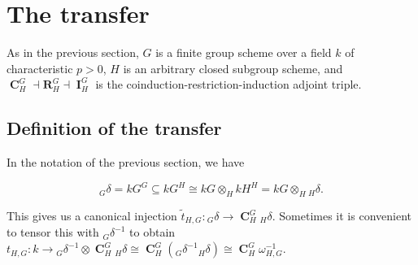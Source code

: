 \documentclass[12pt]{amsart}
\theoremstyle{definition}
\DeclareMathOperator{\ind}{\mathbf{I}}
\DeclareMathOperator{\coind}{\mathbf{C}}
\begin{document}
\section{The transfer}\label{sec:transfer}



As in the previous section, $G$ is a finite group scheme over a field $k$ of characteristic $p>0$, $H$ is an arbitrary closed subgroup scheme, and $\coind_H^G \dashv \mathbf{R}_H^G\dashv \ind_H^G$ is the coinduction-restriction-induction adjoint triple.

\subsection{Definition of the transfer}\label{sec:deftransfer}
In the notation of the previous section, we have 

\[ {}_G \delta = kG^G \subseteq kG^H \cong kG \otimes_H kH^H = kG \otimes_H {}_H \delta . \]

This gives us a canonical injection $\tilde{t}_{H,G} \! : {}_G \delta \rightarrow \coind^G_H {}_H \delta $. Sometimes it is convenient to tensor this with ${}_G \delta^{-1}$ to obtain $t_{H,G} \! : k \rightarrow {}_G \delta^{-1} \otimes  \coind^G_H {}_H \delta \cong \coind^G_H ({}_G \delta^{-1} {}_H \delta) \cong \coind ^G_H \omega^{-1}_{H,G}$.
\end{document}
